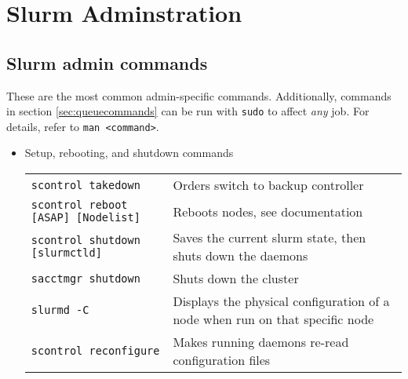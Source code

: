 \chapter{Slurm Adminstration} \label{ch:slurmAdministration}

\section{Slurm admin commands} \label{sec:slurmadmin}
These are the most common admin-specific commands. Additionally, commands in section \ref{sec:queuecommands} can be run with \texttt{sudo} to affect \emph{any} job. For details, refer to \texttt{man <command>}.

\begin{itemize}
  \item Setup, rebooting, and shutdown commands \\
    \begin{tabular}{l p{3.4in}}
      \texttt{scontrol takedown}                 & Orders switch to backup controller \\
      \texttt{scontrol reboot [ASAP] [Nodelist]} & Reboots nodes, see documentation \\
      \texttt{scontrol shutdown [slurmctld]}     & Saves the current slurm state, then shuts down the daemons \\
      \texttt{sacctmgr shutdown}                 & Shuts down the cluster \\
      \texttt{slurmd -C}                         & Displays the physical configuration of a node when run on that specific node \\
      \texttt{scontrol reconfigure}              & Makes running daemons re-read configuration files \\
    \end{tabular}


\end{itemize}
